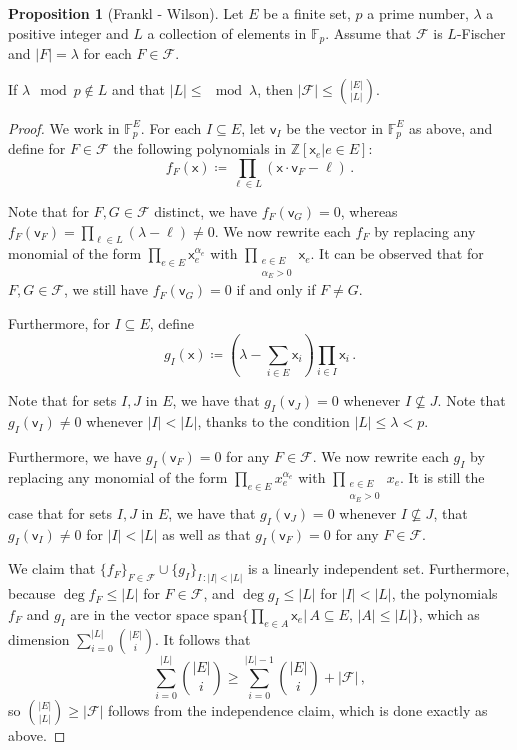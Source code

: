 \documentclass[12pt]{amsart}
\theoremstyle{definition}
\newtheorem{prop}[thm]{Proposition}
\newcommand{\Z}{\mathbb{Z}}
\newcommand{\F}{\mathbb{F}}
\newcommand{\FF}{\mathcal F}
\newcommand{\vv}{\mathsf{v}}
\newcommand{\vx}{\mathsf{x}}
\newcommand{\spn}{\mathrm{span}}
\begin{document}
\begin{prop}[Frankl - Wilson]\label{prop:frankl_wilson_fixed_size}
Let $E$ be a finite set, $p$ a prime number, $\lambda$ a positive integer and $L$ a collection of elements in $\F_p$.
Assume that $\FF$ is $L$-Fischer and $|F| = \lambda $ for each $F \in \FF$.

If $\lambda \mod p\not\in L$ and that $|L| \leq \mod \lambda$, then $|\FF| \leq \binom{|E|}{|L|}$.
\end{prop}

\begin{proof}
We work in $\F_p^E$.
For each $I \subseteq E$, let $\vv_I$ be the vector in $\F_p^E$ as above, and define for $F \in \FF$ the following polynomials in $\Z[\vx_e | e \in E]$:
$$f_F(\vx) \coloneqq \prod_{\ell \in L } (\vx \cdot \vv_{F} - \ell ) \, .$$

Note that for $F, G \in \FF$ distinct, we have $f_F(\vv_G) = 0$, whereas $f_F(\vv_F) = \prod_{\ell \in L } (\lambda - \ell )\neq 0$.
We now rewrite each $f_F$ by replacing any monomial of the form $\prod_{e\in E}\vx_e^{\alpha_e}$ with $\prod_{\substack{e\in E\\ \alpha_E > 0}}\vx_e$.
It can be observed that for $F, G \in \FF$, we still have $f_F(\vv_G) = 0$ if and only if $F \neq G$.

Furthermore, for $I\subseteq E$, define 
$$g_I(\vx) \coloneqq (\lambda - \sum_{i\in E} \vx_i)\prod_{i\in I} \vx_i\, .$$

Note that for sets $I, J$ in $E$, we have that $g_I(\vv_J ) = 0$ whenever $I\not\subseteq J$.
Note that $g_I(\vv_I) \neq 0$ whenever $|I| < |L|$, thanks to the condition $|L| \leq \lambda < p$.

Furthermore, we have $g_I(\vv_F) = 0$ for any $F \in \FF$.
We now rewrite each $g_I$ by replacing any monomial of the form $\prod_{e\in E}x_e^{\alpha_e}$ with $\prod_{\substack{e\in E\\ \alpha_E > 0}}x_e$.
It is still the case that for sets $I, J$ in $E$, we have that $g_I(\vv_J ) = 0$ whenever $I\not\subseteq J$, that $g_I(\vv_I) \neq 0$ for $|I| < |L|$ as well as that $g_I(\vv_F) = 0$ for any $F \in \FF$.

We claim that $\{ f_F \}_{F \in \FF}\cup \{g_I \}_{I \, : |I| < |L| }$ is a linearly independent set.
Furthermore, because $\deg f_F \leq |L|$ for $F \in \FF$, and $\deg g_I \leq |L|$ for $|I| < |L|$, the polynomials $f_F$ and $g_I$ are in the vector space $\spn\{\prod_{e \in A} \vx_e | \, A \subseteq E, \, |A| \leq |L| \}$, which as dimension $\sum_{i=0}^{|L|} \binom{|E|}{i}$.
It follows that
$$ \sum_{i=0}^{|L|} \binom{|E|}{i} \geq \sum_{i=0}^{|L|-1} \binom{|E|}{i} + |\FF| \, ,$$
so $\binom{|E|}{|L|} \geq |\FF|$ follows from the independence claim, which is done exactly as above.
\end{proof}
\end{document}
